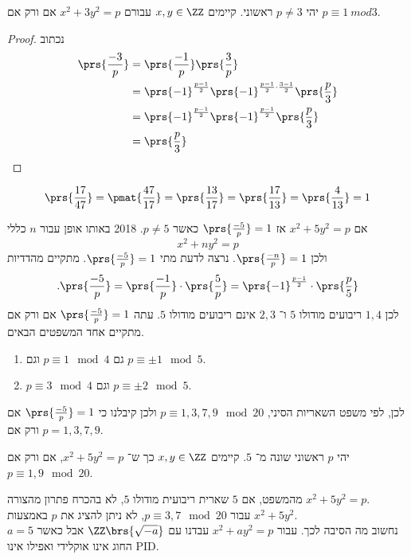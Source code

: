 \documentclass[a4paper,10pt,twoside,openany]{book}
\begin{document}
\begin{theorem}[אוילר]
יהי
$p \neq 3$
ראשוני. קיימים
$x,y \in \ZZ$
עבורם
$x^2 + 3y^2 = p$
אם ורק אם
$p \equiv 1\ mod{3}$.
\end{theorem}
\begin{proof}
נכתוב
\begin{align*}
\prs{\frac{-3}{p}} &= \prs{\frac{-1}{p}} \prs{\frac{3}{p}} \\
&= \prs{-1}^{\frac{p-1}{2}} \prs{-1}^{\frac{p-1}{2} \cdot \frac{3-1}{2}} \prs{\frac{p}{3}}
\\&= \prs{-1}^{\frac{p-1}{2}} \prs{-1}^{\frac{p-1}{2}} \prs{\frac{p}3{}} \\&= \prs{\frac{p}{3}}
\end{align*}
\end{proof}

\begin{example}
\[\prs{\frac{17}{47}} = \pmat{\frac{47}{17}} = \prs{\frac{13}{17}} = \prs{\frac{17}{13}} = \prs{\frac{4}{13}} = 1\]
\end{example}

\begin{example}

אם
$x^2 + 5y^2 = p$
אז
$\prs{\frac{-5}{p}} = 1$
כאשר
$p \neq 5$. %
{2018}
באותו אופן עבור
$n$
כללי
\[x^2 + ny^2 = p\]
ולכן
$\prs{\frac{-n}{p}} = 1$.
נרצה לדעת מתי
$\prs{\frac{-5}{p}} = 1$.
מתקיים מהדדיות
\[\text{.} \prs{\frac{-5}{p}} = \prs{\frac{-1}{p}} \cdot \prs{\frac{5}{p}} = \prs{-1}^{\frac{p-1}{2}} \cdot \prs{\frac{p}{5}}\]
לכן
$1,4$
ריבועים מודולו
$5$
ו־%
$2,3$
אינם ריבועים מודולו
$5$.
עתה
$\prs{\frac{-5}{p}} = 1$
אם ורק אם
מתקיים אחד המשפטים הבאים.
\begin{enumerate}
\item  גם
$p \equiv 1 \mod{4}$
וגם
$p \equiv \pm 1 \mod{5}$.
\item 
$p \equiv 3 \mod{4}$
וגם
$p \equiv \pm 2 \mod{5}$.
\end{enumerate}
לכן, לפי משפט השאריות הסיני,
$p \equiv 1,3,7,9 \mod {20}$
ולכן קיבלנו כי
$\prs{\frac{-5}{p}} = 1$
אם ורק אם
$p = 1,3,7,9$.
\end{example}

\begin{theorem}[לגרנג']
יהי
$p$
ראשוני שונה מ־%
$5$.
קיימים
$x,y \in \ZZ$
כך ש־%
$x^2 + 5y^2 = p$,
אם ורק אם
$p \equiv 1,9 \mod{20}$.
\end{theorem}
\begin{remark}
מהמשפט, אם
$5$
שארית ריבועית מודולו
$5$,
לא בהכרח פתרון מהצורה
$x^2 + 5y^2 = p$.
\\
עבור
$p \equiv 3,7 \mod{20}$,
לא ניתן להציג את
$p$
באמצעות
$x^2 + 5y^2$.\\
נחשוב מה הסיבה לכך.
עבור
$x^2 + ay^2 = p$
עבדנו עם
$\ZZ\brs{\sqrt{-a}}$
אבל כאשר
$a = 5$
החוג אינו אוקלידי ואפילו אינו
\textenglish{PID}.
\end{remark}
\end{document}
